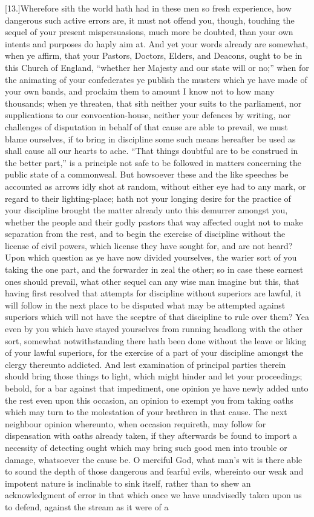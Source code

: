[13.]Wherefore sith the world hath had in these men so fresh experience, how dangerous such active errors are, it must not offend you, though, touching the sequel of your present mispersuasions, much more be doubted, than your own intents and purposes do haply aim at. And yet your words already are somewhat, when ye affirm, that your Pastors, Doctors, Elders, and Deacons, ought to be in this Church of England, “whether her Majesty and our state will or no;” when for the animating of your confederates ye publish the musters which ye have made of your own bands, and proclaim them to amount I know not to how many thousands; when ye threaten, that sith neither your suits to the parliament, nor supplications to our convocation-house, neither your defences by writing, nor challenges of disputation in behalf of that cause are able to prevail, we must blame ourselves, if to bring in discipline some such means hereafter be used as shall cause all our hearts to ache. “That things doubtful are to be construed in the better part,” is a principle not safe to be followed in matters concerning the public state of a commonweal. But howsoever these and the like speeches be accounted as arrows idly shot at random, without either eye had to any mark, or regard to their lighting-place; hath not your longing desire for the practice of your discipline brought the matter already unto this demurrer amongst you, whether the people and their godly pastors that way affected ought not to make separation from the rest, and to begin the exercise of discipline without the license of civil powers, which license they have sought for, and are not heard? Upon which question as ye have now divided yourselves, the warier sort of you taking the one part, and the forwarder in zeal the other; so in case these earnest ones should prevail, what other sequel can any wise man imagine but this, that having first resolved that attempts for discipline without superiors are lawful, it will follow in the next place to be disputed what may be attempted against superiors which will not have the sceptre of that discipline to rule over them? Yea even by you which have stayed yourselves from running headlong with the other sort, somewhat notwithstanding there hath been done without the leave or liking of your lawful superiors, for the exercise of a part of your discipline amongst the clergy thereunto addicted. And lest examination of principal parties therein should bring those things to light, which might hinder and let your proceedings; behold, for a bar against that impediment, one opinion ye have newly added unto the rest even upon this occasion, an opinion to exempt you from taking oaths which may turn to the molestation of your brethren in that cause. The next neighbour opinion whereunto, when occasion requireth, may follow for dispensation with oaths already taken, if they afterwards be found to import a necessity of detecting ought which may bring such good men into trouble or damage, whatsoever the cause be. O merciful God, what man’s wit is there able to sound the depth of those dangerous and fearful evils, whereinto our weak and impotent nature is inclinable to sink itself, rather than to shew an acknowledgment of error in that which once we have unadvisedly taken upon us to defend, against the stream as it were of a 